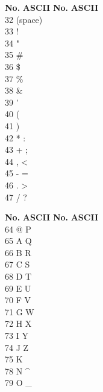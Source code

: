 \documentclass[10pt,landscape,twocolumn,a4paper,notitlepage]{article}
\begin{document}
\begin{tabbing}
\textbf{No.}\hspace{1cm} \=  \textbf{ASCII}\hspace{2cm} \= \textbf{No.}\hspace{1cm} \= \textbf{ASCII}\hspace{2cm}  \\ 
32 \> (space)   \\
33 \> !   \\
34 \> "   \\
35 \> \#   \\
36 \> \$   \\
37 \> \%   \\
38 \> \&   \\
39 \> '   \\
40 \> (   \\
41 \> )   \\
42 \> *  \> : \\
43 \> +  \> ; \\
44 \> ,  \> < \\
45 \> -  \> = \\
46 \> .  \> > \\
47 \> /  \> ? \\ 
\end{tabbing}

\begin{tabbing}
\textbf{No.}\hspace{1cm} \=  \textbf{ASCII}\hspace{2cm} \= \textbf{No.}\hspace{1cm} \= \textbf{ASCII}\hspace{2cm}  \\ 
64 \> @  \> P \\
65 \> A  \> Q \\
66 \> B  \> R \\
67 \> C  \> S \\
68 \> D  \> T \\
69 \> E  \> U \\
70 \> F  \> V \\
71 \> G  \> W \\
72 \> H  \> X \\
73 \> I  \> Y \\
74 \> J  \> Z \\
75 \> K  \> [ \\
76 \> L \> 92 \> \textbackslash \\
77 \> M \> 93 \> ] \\
78 \> N  \> \textasciicircum \\
79 \> O  \> \_ \\ 
\end{tabbing}
\end{document}
